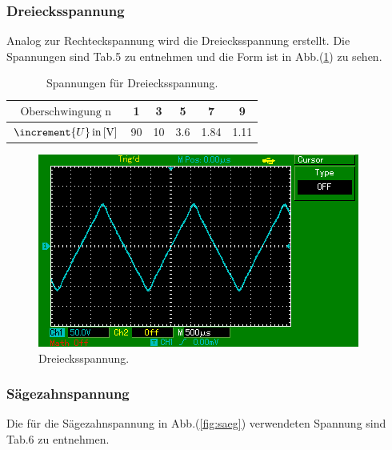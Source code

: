 \subsubsection{Dreiecksspannung}
Analog zur Rechteckspannung wird die Dreiecksspannung erstellt. Die Spannungen
sind Tab.5 zu entnehmen und die Form ist in Abb.(\ref{fig:dreie}) zu sehen.
\begin{table}[h]
  \centering
  \label{tab:5}
  \begin{tabular}{ c c c c c c }
    \toprule
   $ \text{Oberschwingung n} $ & 1 & 3 & 5 & 7 & 9 \\
    \midrule
   $\increment{U}\, \text{in\,[V]}$ &90 & 10 &3.6 &1.84 & 1.11 \\
    \bottomrule
  \end{tabular}
  \caption{Spannungen für Dreiecksspannung.}
\end{table}
\begin{figure}[H]
  \centering
  \includegraphics{content/images/dreieck.png}
  \caption{Dreiecksspannung.}
  \label{fig:dreie}
\end{figure}
\subsubsection{Sägezahnspannung}
Die für die Sägezahnspannung  in Abb.(\ref{fig:saeg}) verwendeten Spannung sind Tab.6 zu entnehmen.

